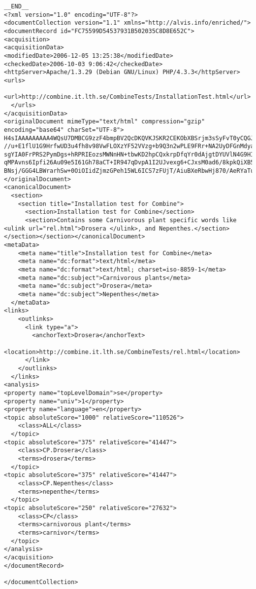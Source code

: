 \begin{verbatim}
__END__
<?xml version="1.0" encoding="UTF-8"?>
<documentCollection version="1.1" xmlns="http://alvis.info/enriched/">
<documentRecord id="FC75599D54537931B502035C8D8E652C">
<acquisition>
<acquisitionData>
<modifiedDate>2006-12-05 13:25:38</modifiedDate>
<checkedDate>2006-10-03 9:06:42</checkedDate>
<httpServer>Apache/1.3.29 (Debian GNU/Linux) PHP/4.3.3</httpServer>
<urls>
    <url>http://combine.it.lth.se/CombineTests/InstallationTest.html</url>
  </urls>
</acquisitionData>
<originalDocument mimeType="text/html" compression="gzip" encoding="base64" charSet="UTF-8">
H4sIAAAAAAAAA4WQsU7DMBCG9zzF4bmpBV2QcDKQVKJSKR2CEKObXBSrjm3sSyFvT0yCQGJgusG/
//u+E1flU1G9HrfwUD3u4fh8v98VwFLOXzYF52VVzg+b9Q3n2wPLE9FRr+NA2UyDFGnMdyaQ1FqS
sgYIA0FrPRS2PymDgs+hRPRIEozsMWNnHN+tbwKD2hpCQxkrpDfqYr0dAjgtDYUVlN4G9HIFB3RT
qMPAvns6Ipfi26Au09e5I61Gh78aCT+IR947qDvpA1I2UJvexg6+CJxsM0ad6/8kpkQiXB5XSWUC
BNsj/GGG4LBWrarhSw+0OiOIidZjmzGPeh15WL6ICS7zFUjT/AiuBXeRbwHj870/AeRYaTupAQAA
</originalDocument>
<canonicalDocument>  
  <section>
    <section title="Installation test for Combine">
      <section>Installation test for Combine</section> 
      <section>Contains some Carnivorous plant specific words like <ulink url="rel.html">Drosera </ulink>, and Nepenthes.</section></section></section></canonicalDocument>
<metaData>
    <meta name="title">Installation test for Combine</meta>
    <meta name="dc:format">text/html</meta>
    <meta name="dc:format">text/html; charset=iso-8859-1</meta>
    <meta name="dc:subject">Carnivorous plants</meta>
    <meta name="dc:subject">Drosera</meta>
    <meta name="dc:subject">Nepenthes</meta>
  </metaData>
<links>
    <outlinks>
      <link type="a">
        <anchorText>Drosera</anchorText>
        <location>http://combine.it.lth.se/CombineTests/rel.html</location>
      </link>
    </outlinks>
  </links>
<analysis>
<property name="topLevelDomain">se</property>
<property name="univ">1</property>
<property name="language">en</property>
<topic absoluteScore="1000" relativeScore="110526">
    <class>ALL</class>
  </topic>
<topic absoluteScore="375" relativeScore="41447">
    <class>CP.Drosera</class>
    <terms>drosera</terms>
  </topic>
<topic absoluteScore="375" relativeScore="41447">
    <class>CP.Nepenthes</class>
    <terms>nepenthe</terms>
  </topic>
<topic absoluteScore="250" relativeScore="27632">
    <class>CP</class>
    <terms>carnivorous plant</terms>
    <terms>carnivor</terms>
  </topic>
</analysis>
</acquisition>
</documentRecord>

</documentCollection>
\end{verbatim}
